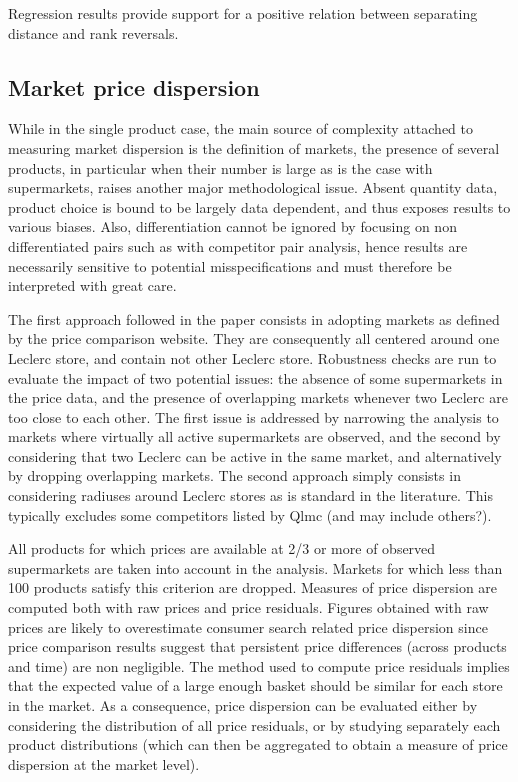 \documentclass[english]{article}
\begin{document}
Regression results provide support for a positive relation between separating distance and rank reversals.


\subsection{Market price dispersion}

While in the single product case, the main source of complexity attached to measuring market dispersion is the definition of markets, the presence of several products, in particular when their number is large as is the case with supermarkets, raises another major methodological issue. Absent quantity data, product choice is bound to be largely data dependent, and thus exposes results to various biases. Also, differentiation cannot be ignored by focusing on non differentiated pairs such as with competitor pair analysis, hence results are necessarily sensitive to potential misspecifications and must therefore be interpreted with great care.

The first approach followed in the paper consists in adopting markets as defined by the price comparison website. They are consequently all centered around one Leclerc store, and contain not other Leclerc store. Robustness checks are run to evaluate the impact of two potential issues: the absence of some supermarkets in the price data, and the presence of overlapping markets whenever two Leclerc are too close to each other. The first issue is addressed by narrowing the analysis to markets where virtually all active supermarkets are observed, and the second by considering that two Leclerc can be active in the same market, and alternatively by dropping overlapping markets. The second approach simply consists in considering radiuses around Leclerc stores as is standard in the literature. This typically excludes some competitors listed by Qlmc (and may include others?).

All products for which prices are available at 2/3 or more of observed supermarkets are taken into account in the analysis. Markets for which less than 100 products satisfy this criterion are dropped. Measures of price dispersion are computed both with raw prices and price residuals. Figures obtained with raw prices are likely to overestimate consumer search related price dispersion since price comparison results suggest that persistent price differences (across products and time) are non negligible. The method used to compute price residuals implies that the expected value of a large enough basket should be similar for each store in the market. As a consequence, price dispersion can be evaluated either by considering the distribution of all price residuals, or by studying separately each product distributions (which can then be aggregated to obtain a measure of price dispersion at the market level).
\end{document}
